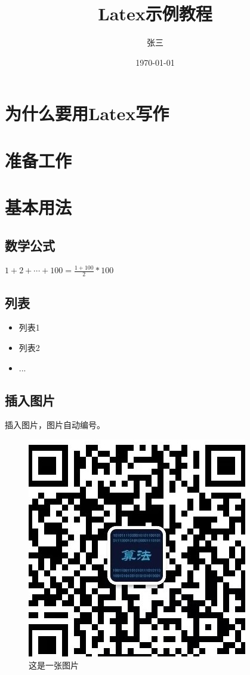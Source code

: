 \documentclass[12pt]{article}
\title{Latex示例教程}
\author{张三}
\date{\today}
\begin{document}
\doublespacing
\maketitle

\section{为什么要用Latex写作}

\section{准备工作}

\section{基本用法}
\subsection{数学公式}
$ 1+2+\cdots+100=\frac{1+100}{2}*100$

\subsection{列表}

\begin{itemize}
    \item 列表1
    \item 列表2
    \item ...
\end{itemize}

\subsection{插入图片}
插入图片，图片自动编号。
\begin{figure}[H]
    \centering
    \includegraphics[scale=0.5]{logo.jpg}
    \caption{这是一张图片}
    \label{}
\end{figure}
\end{document}
